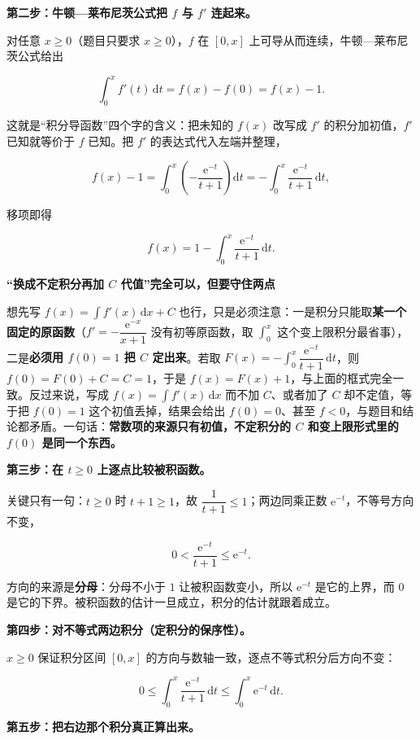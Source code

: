 \documentclass[UTF8,11pt,fontset=windows]{ctexart}
\begin{document}
\textbf{第二步：牛顿—莱布尼茨公式把 $f$ 与 $f'$ 连起来。}

对任意 $x\ge0$（题目只要求 $x\ge0$），$f$ 在 $[0,x]$ 上可导从而连续，牛顿—莱布尼茨公式给出

$$
\int_0^x f'(t)\,\mathrm dt=f(x)-f(0)=f(x)-1.
$$

这就是“积分导函数”四个字的含义：把未知的 $f(x)$ 改写成 $f'$ 的积分加初值，$f'$ 已知就等价于 $f$ 已知。把 $f'$ 的表达式代入左端并整理，

$$
f(x)-1=\int_0^x\left(-\frac{\mathrm e^{-t}}{t+1}\right)\mathrm dt
=-\int_0^x\frac{\mathrm e^{-t}}{t+1}\,\mathrm dt,
$$

移项即得

$$
\boxed{\,f(x)=1-\int_0^x\frac{\mathrm e^{-t}}{t+1}\,\mathrm dt.\,}
$$

{\bfseries “换成不定积分再加 $C$ 代值”完全可以，但要守住两点\par}
想先写 $f(x)=\int f'(x)\,\mathrm dx+C$ 也行，只是必须注意：一是积分只能取\textbf{某一个固定的原函数}（$f'=-\dfrac{\mathrm e^{-x}}{x+1}$ 没有初等原函数，取 $\int_0^x$ 这个变上限积分最省事），二是\textbf{必须用 $f(0)=1$ 把 $C$ 定出来}。若取 $F(x)=-\int_0^x\dfrac{\mathrm e^{-t}}{t+1}\,\mathrm dt$，则 $f(0)=F(0)+C=C=1$，于是 $f(x)=F(x)+1$，与上面的框式完全一致。反过来说，写成 $f(x)=\int f'(x)\,\mathrm dx$ 而不加 $C$、或者加了 $C$ 却不定值，等于把 $f(0)=1$ 这个初值丢掉，结果会给出 $f(0)=0$、甚至 $f<0$，与题目和结论都矛盾。一句话：\textbf{常数项的来源只有初值，不定积分的 $C$ 和变上限形式里的 $f(0)$ 是同一个东西。}

\textbf{第三步：在 $t\ge0$ 上逐点比较被积函数。}

关键只有一句：$t\ge0$ 时 $t+1\ge1$，故 $\dfrac1{t+1}\le1$；两边同乘正数 $\mathrm e^{-t}$，不等号方向不变，

$$
0<\frac{\mathrm e^{-t}}{t+1}\le\mathrm e^{-t}.
$$

方向的来源是\textbf{分母}：分母不小于 $1$ 让被积函数变小，所以 $\mathrm e^{-t}$ 是它的上界，而 $0$ 是它的下界。被积函数的估计一旦成立，积分的估计就跟着成立。

\textbf{第四步：对不等式两边积分（定积分的保序性）。}

$x\ge0$ 保证积分区间 $[0,x]$ 的方向与数轴一致，逐点不等式积分后方向不变：

$$
0\le\int_0^x\frac{\mathrm e^{-t}}{t+1}\,\mathrm dt\le\int_0^x\mathrm e^{-t}\,\mathrm dt.
$$

\textbf{第五步：把右边那个积分真正算出来。}
\end{document}
